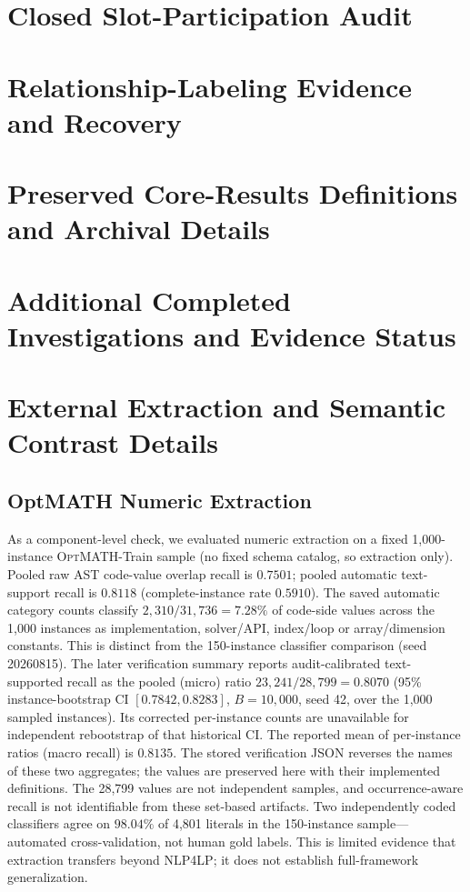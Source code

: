 \documentclass[pdflatex,sn-basic,Numbered]{sn-jnl}
\begin{document}
\section{Closed Slot-Participation Audit}
\label{app:g3}

\section{Relationship-Labeling Evidence and Recovery}



\section{Preserved Core-Results Definitions and Archival Details}

\section{Additional Completed Investigations and Evidence Status}
\label{app:additional-evidence}


\section{External Extraction and Semantic Contrast Details}
\subsection{OptMATH Numeric Extraction}
\label{app:extraction-details}\label{subsec:exp_external_validation}
As a component-level check, we evaluated numeric extraction on a fixed 1,000-instance \textsc{OptMATH}-Train sample \cite{lu2025optmath} (no fixed schema catalog, so extraction only). Pooled raw AST code-value overlap recall is $0.7501$; pooled automatic text-support recall is $0.8118$ (complete-instance rate $0.5910$). The saved automatic category counts classify $2{,}310/31{,}736=7.28\%$ of code-side values across the 1,000 instances as implementation, solver/API, index/loop or array/dimension constants. This is distinct from the 150-instance classifier comparison (seed 20260815). The later verification summary reports audit-calibrated text-supported recall as the pooled (micro) ratio $23{,}241/28{,}799=0.8070$ (95\% instance-bootstrap CI $[0.7842,0.8283]$, $B=10{,}000$, seed 42, over the 1,000 sampled instances). Its corrected per-instance counts are unavailable for independent rebootstrap of that historical CI. The reported mean of per-instance ratios (macro recall) is $0.8135$. The stored verification JSON reverses the names of these two aggregates; the values are preserved here with their implemented definitions. The 28,799 values are not independent samples, and occurrence-aware recall is not identifiable from these set-based artifacts. Two independently coded classifiers agree on $98.04\%$ of 4,801 literals in the 150-instance sample---automated cross-validation, not human gold labels. This is limited evidence that extraction transfers beyond \textsc{NLP4LP}; it does not establish full-framework generalization.
\end{document}
